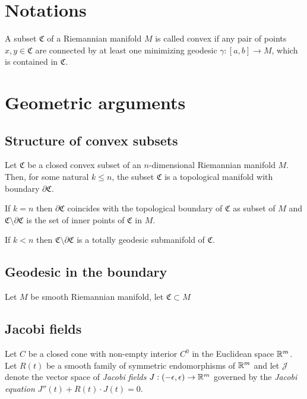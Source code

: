 \documentclass[a4paper,10pt]{article}
\begin{document}
\qeds



 
\section{Notations}
 
A subset $\mathfrak{C}$ of a Riemannian manifold $M$ is called convex if  any pair of points $x,y \in \mathfrak{C}$
are connected by at least one minimizing geodesic $\gamma :[a,b]\to M$, which is  contained in $\mathfrak{C}$.


\section{Geometric arguments}
\subsection{Structure of convex subsets}
Let $\mathfrak{C}$ be a closed convex subset of an $n$-dimensional  Riemannian manifold $M$. Then, for some natural $k\leq n$, the subset $\mathfrak{C}$ is a topological manifold with boundary $\partial \mathfrak{C}$.

If $k=n$ then $\partial \mathfrak{C}$ coincides with the topological boundary of $\mathfrak{C}$ as subset of $M$ and 
$\mathfrak{C}\setminus \partial \mathfrak{C}$ is the set of inner points of $\mathfrak{C}$ in $M$.

If $k<n$ then $\mathfrak{C}\setminus \partial \mathfrak{C}$ is a totally geodesic submanifold of $\mathfrak{C}$.





\subsection{Geodesic in the boundary}
Let $M$ be  smooth Riemannian manifold, let $\mathfrak{C}\subset M$


\subsection{Jacobi fields}
Let $C$ be a closed cone with non-empty interior $C^0$ in the Euclidean space $\mathbb{R}^m$. Let $R(t)$ be a smooth family of symmetric endomorphisms of $\mathbb{R}^m$ and let $\mathcal J$ denote the vector space of \emph{Jacobi fields} 
$J:(-\epsilon, \epsilon) \to \mathbb{R}^m$  governed by the \emph{Jacobi equation} $J''(t)+R(t) \cdot J(t) =0$.
\end{document}
